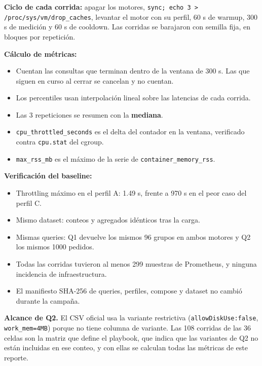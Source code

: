 \documentclass[11pt,letterpaper]{article}
\newcommand{\code}[1]{\texttt{#1}}
\begin{document}
\textbf{Ciclo de cada corrida:} apagar los motores, \code{sync; echo 3 > /\allowbreak{}proc/\allowbreak{}sys/\allowbreak{}vm/\allowbreak{}drop\_\allowbreak{}caches}, levantar el motor con su perfil, 60 s de warmup, 300 s de medición y 60 s de cooldown. Las corridas se barajaron con semilla fija, en bloques por repetición.

\textbf{Cálculo de métricas:}
\nopagebreak

\begin{itemize}
\item Cuentan las consultas que terminan dentro de la ventana de 300 s. Las que siguen en curso al cerrar se cancelan y no cuentan.
\item Los percentiles usan interpolación lineal sobre las latencias de cada corrida.
\item Las 3 repeticiones se resumen con la \textbf{mediana}.
\item \code{cpu\_\allowbreak{}throttled\_\allowbreak{}seconds} es el delta del contador en la ventana, verificado contra \code{cpu.\allowbreak{}stat} del cgroup.
\item \code{max\_\allowbreak{}rss\_\allowbreak{}mb} es el máximo de la serie de \code{container\_\allowbreak{}memory\_\allowbreak{}rss}.
\end{itemize}

\textbf{Verificación del baseline:}
\nopagebreak

\begin{itemize}
\item Throttling máximo en el perfil A: 1.49 s, frente a 970 s en el peor caso del perfil C.
\item Mismo dataset: conteos y agregados idénticos tras la carga.
\item Mismas queries: Q1 devuelve los mismos 96 grupos en ambos motores y Q2 los mismos 1000 pedidos.
\item Todas las corridas tuvieron al menos 299 muestras de Prometheus, y ninguna incidencia de infraestructura.
\item El manifiesto SHA-256 de queries, perfiles, compose y dataset no cambió durante la campaña.
\end{itemize}

\textbf{Alcance de Q2.} El CSV oficial usa la variante restrictiva (\code{allowDiskUse:false}, \code{work\_\allowbreak{}mem=4MB}) porque no tiene columna de variante. Las 108 corridas de las 36 celdas son la matriz que define el playbook, que indica que las variantes de Q2 no están incluidas en ese conteo, y con ellas se calculan todas las métricas de este reporte.
\end{document}
